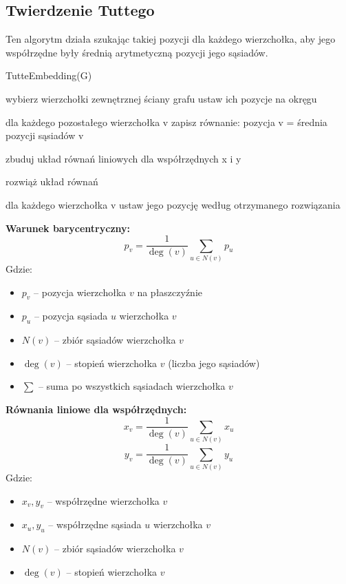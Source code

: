 \documentclass[]{article}
\begin{document}
\subsection{Twierdzenie Tuttego}
	Ten algorytm działa szukając takiej pozycji dla każdego wierzchołka, aby jego współrzędne były średnią arytmetyczną pozycji jego sąsiadów.
	\begin{mylisting}
TutteEmbedding(G)

wybierz wierzchołki zewnętrznej ściany grafu
ustaw ich pozycje na okręgu

dla każdego pozostałego wierzchołka v
    zapisz równanie: pozycja v = średnia pozycji sąsiadów v

zbuduj układ równań liniowych dla współrzędnych x i y

rozwiąż układ równań

dla każdego wierzchołka v
    ustaw jego pozycję według otrzymanego rozwiązania
	\end{mylisting}

\textbf{Warunek barycentryczny:}
\begin{equation}
	p_v = \frac{1}{\deg(v)} \sum_{u \in N(v)} p_u
\end{equation}
Gdzie:
\begin{itemize}
    \item $p_v$ -- pozycja wierzchołka $v$ na płaszczyźnie
    \item $p_u$ -- pozycja sąsiada $u$ wierzchołka $v$
    \item $N(v)$ -- zbiór sąsiadów wierzchołka $v$
    \item $\deg(v)$ -- stopień wierzchołka $v$ (liczba jego sąsiadów)
    \item $\sum$ -- suma po wszystkich sąsiadach wierzchołka $v$
\end{itemize}
\textbf{Równania liniowe dla współrzędnych:}
\begin{equation}
x_v = \frac{1}{\deg(v)} \sum_{u \in N(v)} x_u
\end{equation}
\begin{equation}
y_v = \frac{1}{\deg(v)} \sum_{u \in N(v)} y_u
\end{equation}
Gdzie:
\begin{itemize}
    \item $x_v, y_v$ -- współrzędne wierzchołka $v$
    \item $x_u, y_u$ -- współrzędne sąsiada $u$ wierzchołka $v$
    \item $N(v)$ -- zbiór sąsiadów wierzchołka $v$
    \item $\deg(v)$ -- stopień wierzchołka $v$
\end{itemize}
\end{document}
